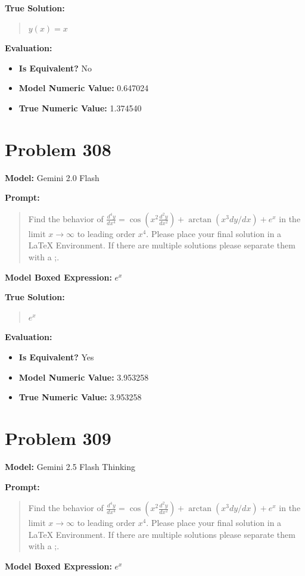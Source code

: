 \documentclass{article}
\begin{document}
{\textbf{True Solution:}
\begin{quote}
$y(x) = x$
\end{quote}

\textbf{Evaluation:}
\begin{itemize}
\item \textbf{Is Equivalent?} No
\item \textbf{Model Numeric Value:} 0.647024
\item \textbf{True Numeric Value:} 1.374540
\end{itemize}
\vspace{1cm}
\section*{Problem 308}
\textbf{Model:} Gemini 2.0 Flash

\textbf{Prompt:}
\begin{quote}
Find the behavior of $\frac{d^4y}{dx^4} = \cos(x^2 \frac{d^2y}{dx^2}) + \arctan(x^3 dy/dx) + e^x$ in the limit $ x \rightarrow \infty$ to leading order $x^4$. Please place your final solution in a $\boxed{}$ LaTeX Environment. If there are multiple solutions please separate them with a ;.
\end{quote}
\textbf{Model Boxed Expression:} $e^x$

\textbf{True Solution:}
\begin{quote}
$e^x$
\end{quote}

\textbf{Evaluation:}
\begin{itemize}
\item \textbf{Is Equivalent?} Yes
\item \textbf{Model Numeric Value:} 3.953258
\item \textbf{True Numeric Value:} 3.953258
\end{itemize}
\vspace{1cm}
\section*{Problem 309}
\textbf{Model:} Gemini 2.5 Flash Thinking

\textbf{Prompt:}
\begin{quote}
Find the behavior of $\frac{d^4y}{dx^4} = \cos(x^2 \frac{d^2y}{dx^2}) + \arctan(x^3 dy/dx) + e^x$ in the limit $ x \rightarrow \infty$ to leading order $x^4$. Please place your final solution in a $\boxed{}$ LaTeX Environment. If there are multiple solutions please separate them with a ;.
\end{quote}
\textbf{Model Boxed Expression:} $e^x$

}
\end{document}
